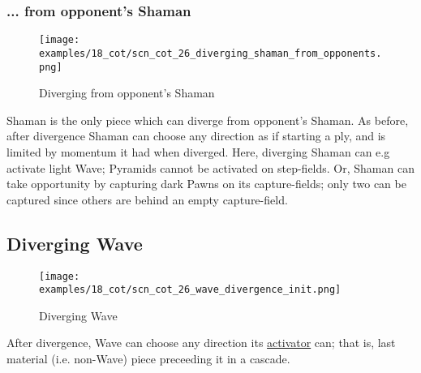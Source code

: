 \subsubsection*{... from opponent's Shaman}
\label{sec:Conquest of Tlalocan/Divergence/... from opponent's Shaman}

\vspace*{-1.4\baselineskip}
\noindent
\begin{figure}[!h]
\texttt{[image: examples/18\_cot/scn\_cot\_26\_diverging\_shaman\_from\_opponents.png]}
\vspace*{-1.3\baselineskip}
\caption{Diverging from opponent's Shaman}
\label{fig:scn_cot_26_diverging_shaman_from_opponents}
\end{figure}

\vspace*{-0.5\baselineskip}
Shaman is the only piece which can diverge from opponent's Shaman. As before, after
divergence Shaman can choose any direction as if starting a ply, and is limited by
momentum it had when diverged. %
Here, diverging Shaman can e.g activate light Wave; Pyramids cannot be activated
on step-fields. Or, Shaman can take opportunity by capturing dark Pawns on its
capture-fields; only two can be captured since others are behind an empty
capture-field.

\clearpage %

\subsection*{Diverging Wave}
\label{sec:Conquest of Tlalocan/Divergence/Diverging Wave}

\vspace*{-1.4\baselineskip}
\noindent
\begin{figure}[!h]
\texttt{[image: examples/18\_cot/scn\_cot\_26\_wave\_divergence\_init.png]}
\vspace*{-1.3\baselineskip}
\caption{Diverging Wave}
\label{fig:scn_cot_26_wave_divergence_init}
\end{figure}

\vspace*{-0.4\baselineskip}
After divergence, Wave can choose any direction its
\hyperref[fig:scn_mv_27_wave_cascading_steps]{activator} can; that is, last material
(i.e. non-Wave) piece preceeding it in a cascade.

